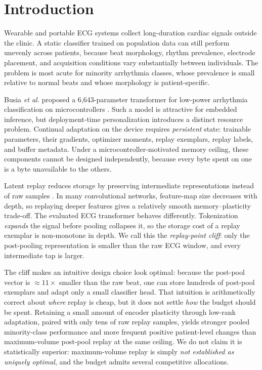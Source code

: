 \section{Introduction}

Wearable and portable ECG systems collect long-duration cardiac signals outside
the clinic. A static classifier trained on population data can still perform
unevenly across patients, because beat morphology, rhythm prevalence, electrode
placement, and acquisition conditions vary substantially between individuals.
The problem is most acute for minority arrhythmia classes, whose prevalence is
small relative to normal beats and whose morphology is patient-specific.

Busia \emph{et al.} proposed a 6{,}643-parameter transformer for low-power
arrhythmia classification on microcontrollers \cite{busia2025tiny}. Such a model
is attractive for embedded inference, but deployment-time personalization
introduces a distinct resource problem. Continual adaptation on the device
requires \emph{persistent} state: trainable parameters, their gradients,
optimizer moments, replay exemplars, replay labels, and buffer metadata. Under
a microcontroller-motivated memory ceiling, these components cannot be designed
independently, because every byte spent on one is a byte unavailable to the
others.

Latent replay reduces storage by preserving intermediate representations
instead of raw samples \cite{pellegrini2020latent,ravaglia2021tinyml}. In many
convolutional networks, feature-map size decreases with depth, so replaying
deeper features gives a relatively smooth memory--plasticity trade-off. The
evaluated ECG transformer behaves differently. Tokenization \emph{expands} the
signal before pooling collapses it, so the storage cost of a replay exemplar is
non-monotone in depth. We call this the \emph{replay-point cliff}: only the
post-pooling representation is smaller than the raw ECG window, and every
intermediate tap is larger.

The cliff makes an intuitive design choice look optimal: because the post-pool
vector is $\approx 11\times$ smaller than the raw beat, one can store hundreds
of post-pool exemplars and adapt only a small classifier head. That intuition is arithmetically correct about
\emph{where} replay is cheap, but it does not settle \emph{how} the budget should
be spent. Retaining a small amount of encoder plasticity through low-rank
adaptation, paired with only tens of raw replay samples, yields stronger pooled
minority-class performance and more frequent positive patient-level changes than
maximum-volume post-pool replay at the same ceiling. We do not claim it is
statistically superior: maximum-volume replay is simply \emph{not established as
uniquely optimal}, and the budget admits several competitive allocations.

